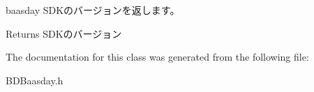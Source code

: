 baasday S\-D\-Kのバージョンを返します。 

\begin{DoxyReturn}{Returns}
S\-D\-Kのバージョン 
\end{DoxyReturn}


The documentation for this class was generated from the following file\-:\begin{DoxyCompactItemize}
\item 
B\-D\-Baasday.\-h\end{DoxyCompactItemize}
